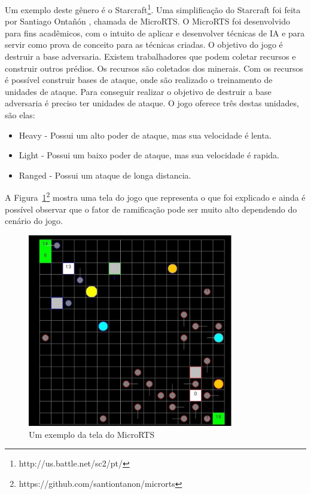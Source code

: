 Um exemplo deste gênero é o Starcraft\footnote{http://us.battle.net/sc2/pt/}.  Uma simplificação do Starcraft foi feita por Santiago Ontañón \cite{ontanon2013combinatorial}, chamada de MicroRTS. O MicroRTS foi desenvolvido para fins acadêmicos, com o intuito de aplicar e desenvolver técnicas de IA e para servir como prova de conceito para as técnicas criadas.  O objetivo do jogo é destruir a base adversaria. Existem trabalhadores que podem coletar recursos e construir outros prédios. Os recursos são coletados dos minerais. Com os recursos é possível construir bases de ataque, onde são realizado o treinamento de unidades de ataque. Para conseguir realizar o objetivo de destruir a base adversaria é preciso ter unidades de ataque. O jogo oferece três destas unidades, são elas:

\begin{itemize}
	\item Heavy - Possui um alto poder de ataque, mas sua velocidade é lenta.
	\item Light - Possui um baixo poder de ataque, mas sua velocidade é rapida.
	\item Ranged - Possui um ataque de longa distancia. 
\end{itemize} 

A Figura~\ref{fig:microrts}\footnote{https://github.com/santiontanon/microrts} mostra uma tela do jogo que representa o que foi explicado e ainda é possível observar que o fator de ramificação pode ser muito alto dependendo do cenário do jogo. %

\begin{figure}[ht]
	\centering
	\includegraphics[width=0.8\textwidth]{fig/microrts.pdf}
	\caption{Um exemplo da tela do MicroRTS}
	\label{fig:microrts}
\end{figure} 

